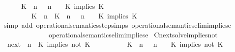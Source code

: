 \begin{isabellebody}
\ \ \ \ {\isasymsupseteq}\ {\isacharbraceleft}\ {\isacharparenleft}{\isacharparenleft}K\ {\isasymnot}{\isasymUp}\ n{\isacharparenright}\ {\isacharhash}\ {\isasymGamma}{\isacharparenright}{\isacharcomma}\ n\ {\isasymturnstile}\ {\isasymPsi}\ {\isasymtriangleright}\ {\isacharparenleft}{\isacharparenleft}K\ implies\ K\ {\isacharhash}\ {\isasymPhi}{\isacharparenright}{\isacharcomma}\isanewline
\ \ \ \ \ \ \ \ \ {\isacharparenleft}{\isacharparenleft}K\ {\isasymUp}\ n{\isacharparenright}\ {\isacharhash}\ {\isacharparenleft}K\ {\isasymUp}\ n{\isacharparenright}\ {\isacharhash}\ {\isasymGamma}{\isacharparenright}{\isacharcomma}\ n\ {\isasymturnstile}\ {\isasymPsi}\ {\isasymtriangleright}\ {\isacharparenleft}{\isacharparenleft}K\ implies\ K\ {\isacharhash}\ {\isasymPhi}{\isacharparenright}\ {\isacharbraceright}{\isacartoucheclose}\isanewline
%
\isadelimproof
%
\endisadelimproof
%
\isatagproof
{}\isamarkupfalse%
\ {\isacharparenleft}simp\ add{\isacharcolon}\ operational{\isacharunderscore}semantics{\isacharunderscore}step{\isachardot}simps\ operational{\isacharunderscore}semantics{\isacharunderscore}elim{\isachardot}implies{\isacharunderscore}e{}\isanewline
\ \ \ \ \ \ \ \ \ \ \ \ \ \ operational{\isacharunderscore}semantics{\isacharunderscore}elim{\isachardot}implies{\isacharunderscore}e{}{\isacharparenright}%
\endisatagproof
{\isafoldproof}%
%
\isadelimproof
\isanewline
%
\endisadelimproof
\isanewline
{}\isamarkupfalse%
\ Cnext{\isacharunderscore}solve{\isacharunderscore}implies{\isacharunderscore}not{\isacharcolon}\isanewline
\ \ {\isacartoucheopen}{\isacharparenleft}{\isasymC}\isactrlsub n\isactrlsub e\isactrlsub x\isactrlsub t\ {\isacharparenleft}{\isasymGamma}{\isacharcomma}\ n\ {\isasymturnstile}\ {\isacharparenleft}{\isacharparenleft}K\ implies\ not\ K\ {\isacharhash}\ {\isasymPsi}{\isacharparenright}\ {\isasymtriangleright}\ {\isasymPhi}{\isacharparenright}{\isacharparenright}\isanewline
\ \ \ \ {\isasymsupseteq}\ {\isacharbraceleft}\ {\isacharparenleft}{\isacharparenleft}K\ {\isasymnot}{\isasymUp}\ n{\isacharparenright}\ {\isacharhash}\ {\isasymGamma}{\isacharparenright}{\isacharcomma}\ n\ {\isasymturnstile}\ {\isasymPsi}\ {\isasymtriangleright}\ {\isacharparenleft}{\isacharparenleft}K\ implies\ not\ K\ {\isacharhash}\ {\isasymPhi}{\isacharparenright}{\isacharcomma}\isanewline

\end{isabellebody}
